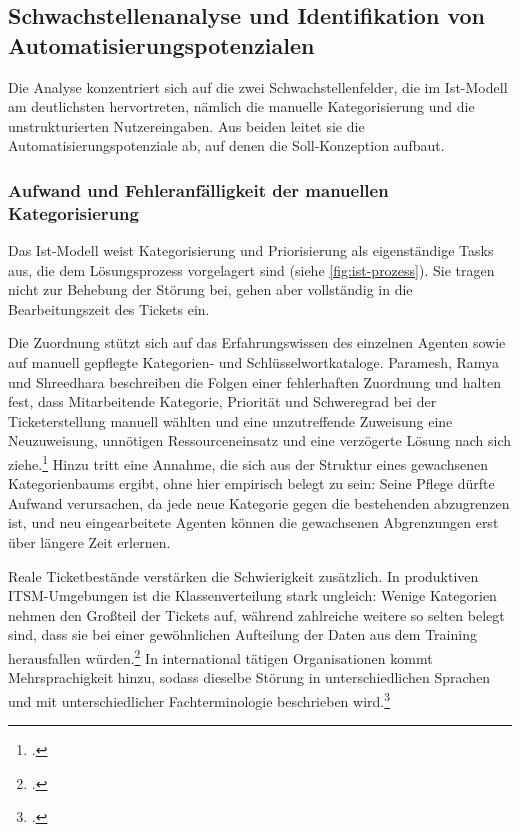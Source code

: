 \subsection{Schwachstellenanalyse und Identifikation von Automatisierungspotenzialen}
\label{schwachstellen}

Die Analyse konzentriert sich auf die zwei Schwachstellenfelder, die im Ist-Modell am deutlichsten hervortreten, n\"amlich die manuelle Kategorisierung und die unstrukturierten Nutzereingaben. Aus beiden leitet sie die Automatisierungspotenziale ab, auf denen die Soll-Konzeption aufbaut.

\subsubsection{Aufwand und Fehleranf\"alligkeit der manuellen Kategorisierung}
\label{manuelleKategorisierung}

Das Ist-Modell weist Kategorisierung und Priorisierung als eigenst\"andige Tasks aus, die dem L\"osungsprozess vorgelagert sind (siehe \autoref{fig:ist-prozess}). Sie tragen nicht zur Behebung der St\"orung bei, gehen aber vollst\"andig in die Bearbeitungszeit des Tickets ein.

Die Zuordnung st\"utzt sich auf das Erfahrungswissen des einzelnen Agenten sowie auf manuell gepflegte Kategorien- und Schl\"usselwortkataloge. Paramesh, Ramya und Shreedhara beschreiben die Folgen einer fehlerhaften Zuordnung und halten fest, dass Mitarbeitende Kategorie, Priorit\"at und Schweregrad bei der Ticketerstellung manuell w\"ahlten und eine unzutreffende Zuweisung eine Neuzuweisung, unn\"otigen Ressourceneinsatz und eine verz\"ogerte L\"osung nach sich ziehe.\footcite[Vgl.][hier S.~221]{Ramya2018} Hinzu tritt eine Annahme, die sich aus der Struktur eines gewachsenen Kategorienbaums ergibt, ohne hier empirisch belegt zu sein: Seine Pflege d\"urfte Aufwand verursachen, da jede neue Kategorie gegen die bestehenden abzugrenzen ist, und neu eingearbeitete Agenten k\"onnen die gewachsenen Abgrenzungen erst \"uber l\"angere Zeit erlernen.

Reale Ticketbest\"ande verst\"arken die Schwierigkeit zus\"atzlich. In produktiven ITSM-Umgebungen ist die Klassenverteilung stark ungleich: Wenige Kategorien nehmen den Gro{\ss}teil der Tickets auf, w\"ahrend zahlreiche weitere so selten belegt sind, dass sie bei einer gew\"ohnlichen Aufteilung der Daten aus dem Training herausfallen w\"urden.\footcite[Vgl.][S.~27]{RazmaJurkus2026} In international t\"atigen Organisationen kommt Mehrsprachigkeit hinzu, sodass dieselbe St\"orung in unterschiedlichen Sprachen und mit unterschiedlicher Fachterminologie beschrieben wird.\footcite[Vgl.][S.~3]{RazmaJurkus2026}

